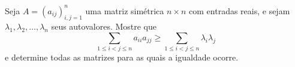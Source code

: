 Seja \(A=(a_{ij})_{i, j=1}^n\) uma matriz simétrica \(n\times n\) com entradas reais, e sejam \(\lambda _1, \lambda _2, \dots, \lambda _n\) seus autovalores. Mostre que
\[\sum_{1\le i<j\le n} a_{ii}a_{jj}\ge \sum_{1\le i < j\le n} \lambda _i \lambda _j\]
e determine todas as matrizes para as quais a igualdade ocorre.
